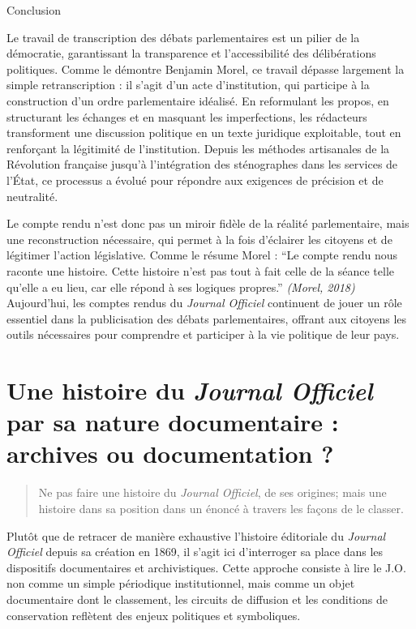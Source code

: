 Conclusion

Le travail de transcription des débats parlementaires est un pilier de la démocratie, garantissant la transparence et l'accessibilité des délibérations politiques. Comme le démontre Benjamin Morel, ce travail dépasse largement la simple retranscription : il s’agit d’un acte d’institution, qui participe à la construction d’un ordre parlementaire idéalisé. En reformulant les propos, en structurant les échanges et en masquant les imperfections, les rédacteurs transforment une discussion politique en un texte juridique exploitable, tout en renforçant la légitimité de l’institution. Depuis les méthodes artisanales de la Révolution française jusqu'à l'intégration des sténographes dans les services de l'État, ce processus a évolué pour répondre aux exigences de précision et de neutralité.

Le compte rendu n’est donc pas un miroir fidèle de la réalité parlementaire, mais une reconstruction nécessaire, qui permet à la fois d’éclairer les citoyens et de légitimer l’action législative. Comme le résume Morel : \enquote{Le compte rendu nous raconte une histoire. Cette histoire n’est pas tout à fait celle de la séance telle qu’elle a eu lieu, car elle répond à ses logiques propres.} \emph{(Morel, 2018)} Aujourd'hui, les comptes rendus du \emph{Journal Officiel} continuent de jouer un rôle essentiel dans la publicisation des débats parlementaires, offrant aux citoyens les outils nécessaires pour comprendre et participer à la vie politique de leur pays.

\section{Une histoire du \emph{Journal Officiel} par sa nature documentaire : archives ou documentation ?}

\begin{quote}
Ne pas faire une histoire du \emph{Journal Officiel}, de ses origines; mais une histoire dans sa position dans un énoncé à travers les façons de le classer.

\end{quote}
Plutôt que de retracer de manière exhaustive l’histoire éditoriale du \emph{Journal Officiel} depuis sa création en 1869, il s’agit ici d’interroger sa place dans les dispositifs documentaires et archivistiques. Cette approche consiste à lire le J.O. non comme un simple périodique institutionnel, mais comme un objet documentaire dont le classement, les circuits de diffusion et les conditions de conservation reflètent des enjeux politiques et symboliques.

